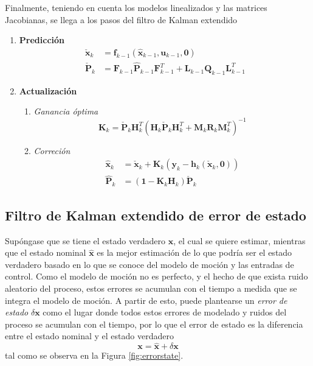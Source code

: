 Finalmente, teniendo en cuenta los modelos linealizados y las matrices Jacobianas, se llega a los pasos del filtro de Kalman extendido
\begin{enumerate}
    \item \textbf{Predicción}
        \begin{align}
            \check{\bm{x}}_k &= \bm{f}_{k-1}(\hat{\bm{x}}_{k-1},\bm{u}_{k-1},\bm{0})\\
            \check{\bm{P}}_k &= \bm{F}_{k-1}\hat{\bm{P}}_{k-1}\bm{F}_{k-1}^T + \bm{L}_{k-1}\bm{Q}_{k-1}\bm{L}_{k-1}^T
        \end{align}
    \item \textbf{Actualización}
    \begin{enumerate}
        \item \textit{Ganancia óptima}
            \begin{equation}
                \bm{K}_k = \check{\bm{P}}_k\bm{H}_k^T(\bm{H}_k\check{\bm{P}}_k\bm{H}_k^T + \bm{M}_k\bm{R}_k\bm{M}_k^T)^{-1}
            \end{equation}
        \item \textit{Correción}
            \begin{align}
                \hat{\bm{x}}_k &= \check{\bm{x}}_k + \bm{K}_k(\bm{y}_k - \bm{h}_k(\check{\bm{x}}_k,\bm{0}))\\
                \hat{\bm{P}}_k &= (\bm{1} - \bm{K}_k\bm{H}_k)\check{\bm{P}}_k
            \end{align}
    \end{enumerate}
\end{enumerate}

\subsection{Filtro de Kalman extendido de error de estado}
Supóngase que se tiene el estado verdadero $\bm{x}$, el cual se quiere estimar, mientras que el estado nominal $\hat{\bm{x}}$ es la mejor estimación de lo que podría ser el estado verdadero basado en lo que se conoce del modelo de moción y las entradas de control. Como el modelo de moción no es perfecto, y el hecho de que exista ruido aleatorio del proceso, estos errores se acumulan con el tiempo a medida que se integra el modelo de moción. A partir de esto, puede plantearse un \textit{error de estado} $\delta \bm{x}$ como el lugar donde todos estos errores de modelado y ruidos del proceso se acumulan con el tiempo, por lo que el error de estado es la diferencia entre el estado nominal y el estado verdadero
\begin{equation}
    \bm{x} = \hat{\bm{x}} + \delta \bm{x}
\end{equation}
tal como se observa en la Figura \ref{fig:errorstate}.

